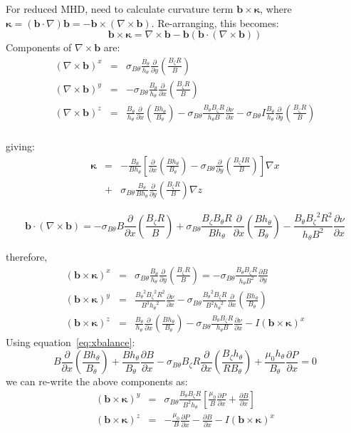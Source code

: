 \documentclass[12pt]{article}
\newcommand{\sbt}{\ensuremath{\sigma_{B\theta}}}
\newcommand{\deriv}[2]{\ensuremath{\frac{\partial #1}{\partial #2}}}
\newcommand{\hthe}{\ensuremath{h_\theta}}
\newcommand{\Bp}{\ensuremath{B_\theta}}
\newcommand{\Bt}{\ensuremath{B_\zeta}}
\newcommand{\Vec}[1]{\ensuremath{\mathbf{#1}}}
\newcommand{\bvec}{\Vec{b}}
\begin{document}
For reduced MHD, need to calculate curvature term $\mathbf{b}\times\mathbf{\kappa}$, where
$\mathbf{\kappa} = \left(\bvec\cdot\nabla\right)\bvec = -\mathbf{b}\times\left(\nabla\times\mathbf{b}\right)$. Re-arranging, this becomes:
\[
\mathbf{b}\times\mathbf{\kappa} = \nabla\times\mathbf{b} - \mathbf{b}\left(\mathbf{b}\cdot\left(\nabla\times\mathbf{b}\right)\right)
\]
Components of $\nabla\times\mathbf{b}$ are:
\begin{eqnarray*}
\left(\nabla\times\mathbf{b}\right)^x &=& \sbt\frac{\Bp}{\hthe}\deriv{}{y}\left(\frac{\Bt R}{B}\right) \\
\left(\nabla\times\mathbf{b}\right)^y &=& -\sbt\frac{\Bp}{\hthe}\deriv{}{x}\left(\frac{\Bt R}{B}\right) \\
\left(\nabla\times\mathbf{b}\right)^z &=& \frac{\Bp}{\hthe}\deriv{}{x}\left(\frac{B\hthe}{\Bp}\right) - \sbt\frac{\Bp\Bt R}{\hthe B}\deriv{\nu}{x} - \sbt I\frac{\Bp}{\hthe}\deriv{}{y}\left(\frac{\Bt R}{B}\right) \\
\end{eqnarray*}

giving:
\begin{eqnarray}
\mathbf{\kappa} &=& -\frac{B_\theta}{B h_\theta}\left[\deriv{}{x}\left(\frac{B h_\theta}{B_\theta}\right) - \sbt\deriv{}{y}\left(\frac{B_\zeta I R}{B}\right)\right]\nabla x \nonumber \\
&+& \sbt\frac{B_\theta}{B h_\theta}\deriv{}{y}\left(\frac{B_\zeta R}{B}\right)\nabla z
\label{eq:curvature}
\end{eqnarray}

\[
\mathbf{b}\cdot\left(\nabla\times\mathbf{b}\right) = -\sbt B\deriv{}{x}\left(\frac{\Bt R}{B}\right) + \sbt \frac{\Bt\Bp R}{B\hthe}\deriv{}{x}\left(\frac{B\hthe}{\Bp}\right) - \frac{\Bp\Bt^2R^2}{\hthe B^2}\deriv{\nu}{x}
\]

therefore,
\begin{eqnarray*}
\left(\mathbf{b}\times\mathbf{\kappa}\right)^x &=& \sbt\frac{\Bp}{\hthe}\deriv{}{y}\left(\frac{\Bt R}{B}\right) = -\sbt\frac{\Bp\Bt R}{\hthe B^2}\deriv{B}{y} \\
\left(\mathbf{b}\times\mathbf{\kappa}\right)^y &=& \frac{\Bp^2\Bt^2 R^2}{B^3\hthe^2}\deriv{\nu}{x} - \sbt\frac{\Bp^2\Bt R}{B^2\hthe^2}\deriv{}{x}\left(\frac{B\hthe}{\Bp}\right) \\
\left(\mathbf{b}\times\mathbf{\kappa}\right)^z &=& \frac{\Bp}{\hthe}\deriv{}{x}\left(\frac{B\hthe}{\Bp}\right) - \sbt\frac{\Bp\Bt R}{\hthe B}\deriv{\nu}{x} - I\left(\mathbf{b}\times\mathbf{\kappa}\right)^x
\end{eqnarray*}
Using equation~\ref{eq:xbalance}:
\[
B\deriv{}{x}\left(\frac{B\hthe}{\Bp}\right) + \frac{B\hthe}{\Bp}\deriv{B}{x} - \sbt\Bt R\deriv{}{x}\left(\frac{\Bt\hthe}{R\Bp}\right) + \frac{\mu_0\hthe}{\Bp}\deriv{P}{x} = 0
\]
we can re-write the above components as:
\begin{eqnarray*}
\left(\mathbf{b}\times\mathbf{\kappa}\right)^y &=& \sbt\frac{\Bp\Bt R}{B^2\hthe}\left[\frac{\mu_0}{B}\deriv{P}{x} + \deriv{B}{x}\right] \\
\left(\mathbf{b}\times\mathbf{\kappa}\right)^z &=& -\frac{\mu_0}{B}\deriv{P}{x} - \deriv{B}{x} - I\left(\mathbf{b}\times\mathbf{\kappa}\right)^x
\end{eqnarray*}
\end{document}
